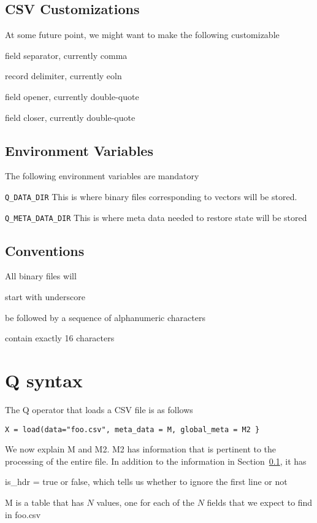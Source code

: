 \documentclass[letterpaper]{article}
\begin{document}
\ee
\subsection{CSV Customizations}
\label{csv_custom}
At some future point, we might want to make the following customizable
\be
\item field separator, currently comma
\item record delimiter, currently eoln
\item field opener, currently double-quote
\item field closer, currently double-quote
\ee

\subsection{Environment Variables}
The following environment variables are mandatory
\be
\item \verb+Q_DATA_DIR+ This is where binary files corresponding to vectors will
  be stored. 
\item \verb+Q_META_DATA_DIR+ This is where meta data needed to restore state
  will be stored
\ee

\subsection{Conventions}
\label{conventions}

All binary files will 
\be
\item start with underscore 
\item be followed by a sequence of alphanumeric characters 
\item contain exactly 16 characters
\ee

\section{Q syntax}
The Q operator that loads a CSV file is as follows
\begin{verbatim}
X = load(data="foo.csv", meta_data = M, global_meta = M2 }
\end{verbatim}

We now explain M and M2. M2 has information that is pertinent to the processing
of the entire file. In addition to the information in Section~\ref{csv_custom},
it has 
\be
\item is\_hdr = true or false, which tells us whether to ignore the first line
  or not
\ee

M is a table that has \(N\) values, one for each of the \(N\) fields
that we expect to find in foo.csv
\end{document}
